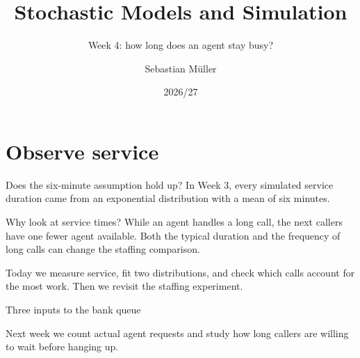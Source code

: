 \documentclass{beamer}
\title[Stochastic Models and Simulation]{Stochastic Models and Simulation}
\subtitle{Week 4: how long does an agent stay busy?}
\author{Sebastian M\"uller}
\date{2026/27}
\begin{document}
\begin{frame}
  \renewcommand{\AMUtitlebar}{%
    \noindent\colorbox{AMU_dk2}{\rule{0pt}{1.2ex}\hspace{\dimexpr0.36\linewidth-2\fboxsep\relax}}%
    \colorbox{AMU_lt2}{\rule{0pt}{1.2ex}\hspace{\dimexpr0.28\linewidth-2\fboxsep\relax}}%
    \colorbox{AMU_acc6}{\rule{0pt}{1.2ex}\hspace{\dimexpr0.36\linewidth-2\fboxsep\relax}}%
  }
  \titlepage
\end{frame}

\section{Observe service}

\begin{frame}{Does the six-minute assumption hold up?}
  In Week 3, every simulated service duration came from an exponential
  distribution with a mean of six minutes.

  \vspace{0.7em}
  \begin{block}{Why look at service times?}
    While an agent handles a long call, the next callers have one fewer
    agent available. Both the typical duration and the frequency of long
    calls can change the staffing comparison.
  \end{block}

  \vspace{0.4em}
  Today we measure service, fit two distributions, and check which calls
  account for the most work. Then we revisit the staffing experiment.
\end{frame}

\begin{frame}{Three inputs to the bank queue}
  \centering

  \vspace{0.8em}
  \raggedright
  Next week we count actual agent requests and study how long callers are
  willing to wait before hanging up.
\end{frame}
\end{document}
